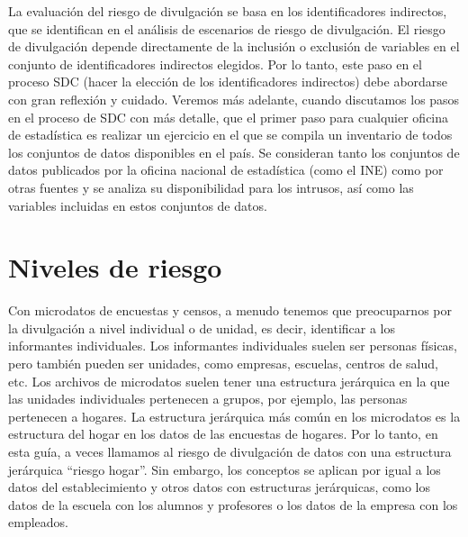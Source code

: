 \documentclass[]{book}
\theoremstyle{definition}
\theoremstyle{definition}
\theoremstyle{definition}
\theoremstyle{definition}
\theoremstyle{remark}
\begin{document}
La evaluación del riesgo de divulgación se basa en los identificadores indirectos, que se identifican en el análisis de escenarios de riesgo de divulgación. El riesgo de divulgación depende directamente de la inclusión o exclusión de variables en el conjunto de identificadores indirectos elegidos. Por lo tanto, este paso en el proceso SDC (hacer la elección de los identificadores indirectos) debe abordarse con gran reflexión y cuidado. Veremos más adelante, cuando discutamos los pasos en el proceso de SDC con más detalle, que el primer paso para cualquier oficina de estadística es realizar un ejercicio en el que se compila un inventario de todos los conjuntos de datos disponibles en el país. Se consideran tanto los conjuntos de datos publicados por la oficina nacional de estadística (como el INE) como por otras fuentes y se analiza su disponibilidad para los intrusos, así como las variables incluidas en estos conjuntos de datos.

\hypertarget{niveles-de-riesgo}{%
\section{Niveles de riesgo}\label{niveles-de-riesgo}}

Con microdatos de encuestas y censos, a menudo tenemos que preocuparnos por la divulgación a nivel individual o de unidad, es decir, identificar a los informantes individuales. Los informantes individuales suelen ser personas físicas, pero también pueden ser unidades, como empresas, escuelas, centros de salud, etc. Los archivos de microdatos suelen tener una estructura jerárquica en la que las unidades individuales pertenecen a grupos, por ejemplo, las personas pertenecen a hogares. La estructura jerárquica más común en los microdatos es la estructura del hogar en los datos de las encuestas de hogares. Por lo tanto, en esta guía, a veces llamamos al riesgo de divulgación de datos con una estructura jerárquica ``riesgo hogar''. Sin embargo, los conceptos se aplican por igual a los datos del establecimiento y otros datos con estructuras jerárquicas, como los datos de la escuela con los alumnos y profesores o los datos de la empresa con los empleados.
\end{document}
